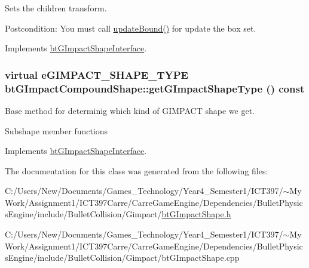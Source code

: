 Sets the children transform. 

\begin{Desc}
\item[Postcondition:]You must call \hyperlink{classbt_g_impact_shape_interface_cb26c2d7a2aecabd06b996b72b848492}{updateBound()} for update the box set. \end{Desc}


Implements \hyperlink{classbt_g_impact_shape_interface_83392f97bd7dfeb71ccdce6913a465b0}{btGImpactShapeInterface}.\hypertarget{classbt_g_impact_compound_shape_861967c52cb52a358b8d99aa4c65e306}{
\subsubsection[getGImpactShapeType]{\setlength{\rightskip}{0pt plus 5cm}virtual eGIMPACT\_\-SHAPE\_\-TYPE btGImpactCompoundShape::getGImpactShapeType () const}}
\label{classbt_g_impact_compound_shape_861967c52cb52a358b8d99aa4c65e306}


Base method for determinig which kind of GIMPACT shape we get. 

Subshape member functions 

Implements \hyperlink{classbt_g_impact_shape_interface_25cacbe448997e3f8ec99cb2d4952859}{btGImpactShapeInterface}.

The documentation for this class was generated from the following files:\begin{CompactItemize}
\item 
C:/Users/New/Documents/Games\_\-Technology/Year4\_\-Semester1/ICT397/$\sim$My Work/Assignment1/ICT397Carre/CarreGameEngine/Dependencies/BulletPhysicsEngine/include/BulletCollision/Gimpact/\hyperlink{bt_g_impact_shape_8h}{btGImpactShape.h}\item 
C:/Users/New/Documents/Games\_\-Technology/Year4\_\-Semester1/ICT397/$\sim$My Work/Assignment1/ICT397Carre/CarreGameEngine/Dependencies/BulletPhysicsEngine/include/BulletCollision/Gimpact/btGImpactShape.cpp\end{CompactItemize}
